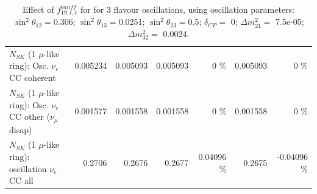 \begin{table}
\begin{tabular}{| l | r | r | r  r | r  r |}
                          $N_{SK}$ (1 $\mu$-like ring): Osc. $\nu_e$ CC coherent &        0.005234 &        0.005093 &        0.005093 &        0 \%  &        0.005093 &        0 \%  \\ 
           $N_{SK}$ (1 $\mu$-like ring): Osc. $\nu_e$ CC other ($\nu_\mu$ disap) &        0.001577 &        0.001558 &        0.001558 &        0 \%  &        0.001558 &        0 \%  \\ 
                        $N_{SK}$ (1 $\mu$-like ring): oscillation $\nu_e$ CC all &          0.2706 &          0.2676 &          0.2677 &  0.04096 \%  &          0.2675 & -0.04096 \%  \\ 
\hline
\hline
\end{tabular}
\caption{ Effect of $f_{19; t, r}^{banff}$ for for 3 flavour oscillations, using oscillation parameters:  $\sin^2\theta_{12} = $0.306; $\sin^2\theta_{13} = $0.0251; $\sin^2\theta_{23} = $0.5; $\delta_{CP} = $        0; $\Delta m^2_{21} = $    7.5e-05; $\Delta m^2_{32} = $    0.0024. }
\label{tab:num_banff_ccqeE1_1RmuT_3f_osc_t13:0.0251}
\end{table}
\clearpage
